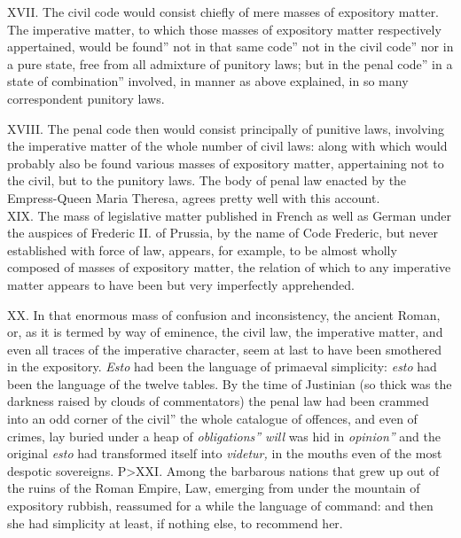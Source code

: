 \documentclass[12pt]{report}
\begin{document}
XVII. The civil code would consist chiefly of mere masses of expository
matter. The imperative matter, to which those masses of expository
matter respectively appertained, would be found'' not in that
same code'' not in the civil code'' nor in a pure state,
free from all admixture of punitory laws; but in the penal
code'' in a state of combination'' involved, in manner
as above explained, in so many correspondent punitory laws.

XVIII. The penal code then would consist principally of punitive laws,
involving the imperative matter of the whole number of civil laws: along
with which would probably also be found various masses of expository
matter, appertaining not to the civil, but to the punitory laws. The
body of penal law enacted by the Empress-Queen Maria Theresa, agrees
pretty well with this account.\\
XIX. The mass of legislative matter published in French as well as
German under the auspices of Frederic II. of Prussia, by the name of
Code Frederic, but never established with force of law, appears, for
example, to be almost wholly composed of masses of expository matter,
the relation of which to any imperative matter appears to have been but
very imperfectly apprehended.

XX. In that enormous mass of confusion and inconsistency, the ancient
Roman, or, as it is termed by way of eminence, the civil law, the
imperative matter, and even all traces of the imperative character, seem
at last to have been smothered in the expository. \emph{Esto} had been
the language of primaeval simplicity: \emph{esto} had been the language
of the twelve tables. By the time of Justinian (so thick was the
darkness raised by clouds of commentators) the penal law had been
crammed into an odd corner of the civil'' the whole catalogue of
offences, and even of crimes, lay buried under a heap of
\emph{obligations'' will} was hid in \emph{opinion''}
and the original \emph{esto} had transformed itself into \emph{videtur,}
in the mouths even of the most despotic sovereigns. P\textgreater{}XXI.
Among the barbarous nations that grew up out of the ruins of the Roman
Empire, Law, emerging from under the mountain of expository rubbish,
reassumed for a while the language of command: and then she had
simplicity at least, if nothing else, to recommend her.
\end{document}
